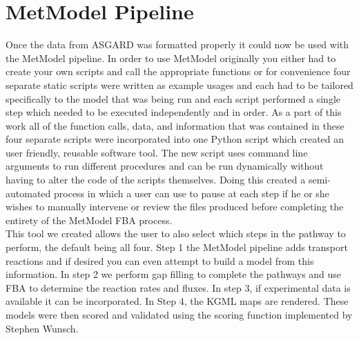 \section{MetModel Pipeline}

\indent\indent Once the data from ASGARD was formatted properly it could now be used with the MetModel pipeline.  In order to use MetModel originally you either had to create your own scripts and call the appropriate functions or for convenience four separate static scripts were written as example usages and each had to be tailored specifically to the model that was being run and each script performed a single step which needed to be executed independently and in order. As a part of this work all of the function calls, data, and information that was contained in these four separate scripts were incorporated into one Python script which created an user friendly, reusable software tool. The new script uses command line arguments to run different procedures and can be run dynamically without having to alter the code of the scripts themselves.  Doing this created a semi-automated process in which a user can use to pause at each step if he or she wishes to manually intervene or review the files produced before completing the entirety of the MetModel FBA process. \\ 
%
%
%
\indent This tool we created allows the user to also select which steps in the pathway to perform, the default being all four.  Step 1 the MetModel pipeline adds transport reactions and if desired you can even attempt to build a model from this information. In step 2 we perform gap filling to complete the pathways and use FBA to determine the reaction rates and fluxes. In step 3, if experimental data is available it can be incorporated. In Step 4, the KGML maps are rendered.	These models were then scored and validated using the scoring function implemented by Stephen Wunsch\citep{wunsch_stephen_a._scoring_2016}.  \\
%
%
%
%
%

